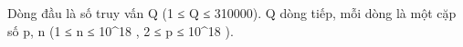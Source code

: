 Dòng đầu là số truy vấn Q (1 ≤ Q ≤ 310000). Q dòng tiếp, mỗi dòng là một cặp số p, n (1 ≤ n ≤ 10^18 , 2 ≤ p ≤ 10^18 ).